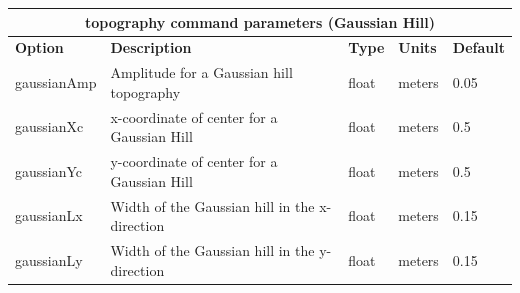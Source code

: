 \documentclass[11pt]{report}
\begin{document}
\begin{center}
\begin{tabular}{|l|p{8cm}|l|l|l|} \hline
\multicolumn{5}{|c|}{\bf topography command parameters (Gaussian Hill)}\\ \hline
\bf{Option} & \bf{Description} & \bf{Type} & \bf{Units} & \bf{Default}\\ \hline \hline
%
gaussianAmp & Amplitude for a Gaussian hill topography & float & meters & 0.05\\ \hline	
gaussianXc & x-coordinate of center for a Gaussian Hill & float & meters & 0.5\\ \hline	
gaussianYc & y-coordinate of center for a Gaussian Hill & float & meters & 0.5 \\ \hline
gaussianLx & Width of the Gaussian hill in the x-direction & float & meters & 0.15 \\ \hline
gaussianLy & Width of the Gaussian hill in the y-direction & float & meters & 0.15 \\ \hline
\end{tabular}
\end{center}

\end{document}

